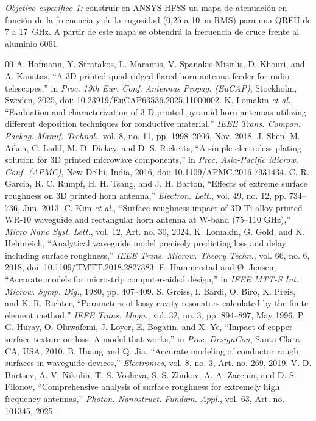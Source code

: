 \documentclass[conference]{IEEEtran}
\begin{document}
\textit{Objetivo específico 1:} construir en ANSYS HFSS un mapa de atenuación en función de la frecuencia y de la rugosidad (0,25 a 10~\textmu m RMS) para una QRFH de 7 a 17~GHz. A partir de este mapa se obtendrá la frecuencia de cruce frente al aluminio 6061.

\clearpage
\renewcommand{\refname}{Anexo: Referencias}
\begin{thebibliography}{00}
 A. Hofmann, Y. Stratakos, L. Marantis, V. Spanakis-Misirlis, D. Khouri, and A. Kanatas, ``A 3D printed quad-ridged flared horn antenna feeder for radio-telescopes,'' in \textit{Proc. 19th Eur. Conf. Antennas Propag. (EuCAP)}, Stockholm, Sweden, 2025, doi: 10.23919/EuCAP63536.2025.11000002.
 K. Lomakin \textit{et al.}, ``Evaluation and characterization of 3-D printed pyramid horn antennas utilizing different deposition techniques for conductive material,'' \textit{IEEE Trans. Compon. Packag. Manuf. Technol.}, vol. 8, no. 11, pp. 1998--2006, Nov. 2018.
 J. Shen, M. Aiken, C. Ladd, M. D. Dickey, and D. S. Ricketts, ``A simple electroless plating solution for 3D printed microwave components,'' in \textit{Proc. Asia-Pacific Microw. Conf. (APMC)}, New Delhi, India, 2016, doi: 10.1109/APMC.2016.7931434.
 C. R. Garcia, R. C. Rumpf, H. H. Tsang, and J. H. Barton, ``Effects of extreme surface roughness on 3D printed horn antenna,'' \textit{Electron. Lett.}, vol. 49, no. 12, pp. 734--736, Jun. 2013.
 C. Kim \textit{et al.}, ``Surface roughness impact of 3D Ti-alloy printed WR-10 waveguide and rectangular horn antenna at W-band (75--110 GHz),'' \textit{Micro Nano Syst. Lett.}, vol. 12, Art. no. 30, 2024.
 K. Lomakin, G. Gold, and K. Helmreich, ``Analytical waveguide model precisely predicting loss and delay including surface roughness,'' \textit{IEEE Trans. Microw. Theory Techn.}, vol. 66, no. 6, 2018, doi: 10.1109/TMTT.2018.2827383.
 E. Hammerstad and \O. Jensen, ``Accurate models for microstrip computer-aided design,'' in \textit{IEEE MTT-S Int. Microw. Symp. Dig.}, 1980, pp. 407--409.
 S. Groiss, I. Bardi, O. Biro, K. Preis, and K. R. Richter, ``Parameters of lossy cavity resonators calculated by the finite element method,'' \textit{IEEE Trans. Magn.}, vol. 32, no. 3, pp. 894--897, May 1996.
 P. G. Huray, O. Oluwafemi, J. Loyer, E. Bogatin, and X. Ye, ``Impact of copper surface texture on loss: A model that works,'' in \textit{Proc. DesignCon}, Santa Clara, CA, USA, 2010.
 B. Huang and Q. Jia, ``Accurate modeling of conductor rough surfaces in waveguide devices,'' \textit{Electronics}, vol. 8, no. 3, Art. no. 269, 2019.
 V. D. Burtsev, A. V. Nikulin, T. S. Vosheva, S. S. Zhukov, A. A. Zarenin, and D. S. Filonov, ``Comprehensive analysis of surface roughness for extremely high frequency antennas,'' \textit{Photon. Nanostruct. Fundam. Appl.}, vol. 63, Art. no. 101345, 2025.
\end{thebibliography}
\end{document}

